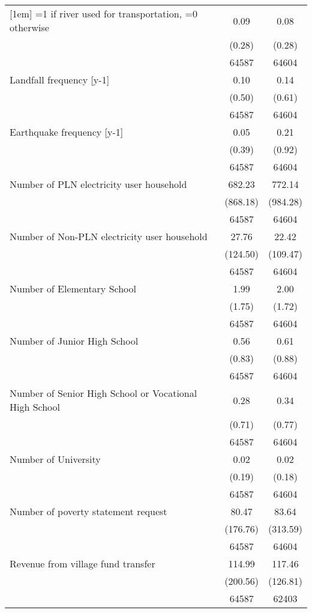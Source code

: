 \begin{tabular}{l*{2}{c}}
[1em]
=1 if river used for transportation, =0 otherwise&        0.09&        0.08\\
                    &      (0.28)&      (0.28)\\
                    &       64587&       64604\\
[1em]
Landfall frequency [y-1]&        0.10&        0.14\\
                    &      (0.50)&      (0.61)\\
                    &       64587&       64604\\
[1em]
Earthquake frequency [y-1]&        0.05&        0.21\\
                    &      (0.39)&      (0.92)\\
                    &       64587&       64604\\
[1em]
Number of PLN electricity user household&      682.23&      772.14\\
                    &    (868.18)&    (984.28)\\
                    &       64587&       64604\\
[1em]
Number of Non-PLN electricity user household&       27.76&       22.42\\
                    &    (124.50)&    (109.47)\\
                    &       64587&       64604\\
[1em]
Number of Elementary School&        1.99&        2.00\\
                    &      (1.75)&      (1.72)\\
                    &       64587&       64604\\
[1em]
Number of Junior High School&        0.56&        0.61\\
                    &      (0.83)&      (0.88)\\
                    &       64587&       64604\\
[1em]
Number of Senior High School or Vocational High School&        0.28&        0.34\\
                    &      (0.71)&      (0.77)\\
                    &       64587&       64604\\
[1em]
Number of University&        0.02&        0.02\\
                    &      (0.19)&      (0.18)\\
                    &       64587&       64604\\
[1em]
Number of poverty statement request&       80.47&       83.64\\
                    &    (176.76)&    (313.59)\\
                    &       64587&       64604\\
[1em]
Revenue from village fund transfer&      114.99&      117.46\\
                    &    (200.56)&    (126.81)\\
                    &       64587&       62403\\
\hline\hline
\end{tabular}
